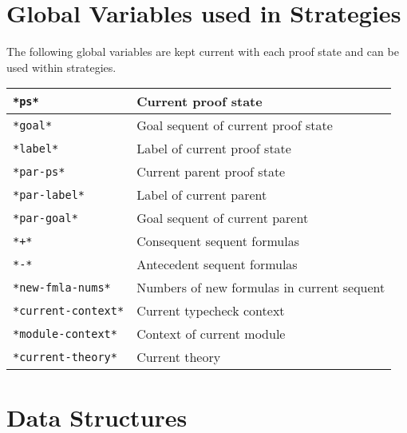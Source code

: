 \documentclass[12pt]{book}
\makeatletter
\newcommand{\indtt}[1]{\texttt{#1}\index{#1@{\texttt{#1}}}}  %
\makeatother
\begin{document}
\section{Global Variables used in Strategies}

The following global variables are kept current with each proof state
and can be used within strategies.  

\noindent
\begin{tabularx}{\textwidth}{|l|X|}
\hline
\indtt{*ps*} & Current proof state \\\hline
\indtt{*goal*} & Goal sequent of current proof state \\\hline
\indtt{*label*} & Label of current proof state  \\\hline
\indtt{*par-ps*} & Current parent proof state \\\hline
\indtt{*par-label*} & Label of current parent \\\hline
\indtt{*par-goal*} & Goal sequent of current parent \\\hline
\indtt{*+*} & Consequent sequent formulas \\\hline
\indtt{*-*} & Antecedent sequent formulas \\\hline
\indtt{*new-fmla-nums*} &  Numbers of new formulas in current sequent
\\\hline
\indtt{*current-context*} & Current typecheck context \\\hline
\indtt{*module-context*} & Context of current module \\\hline
\indtt{*current-theory*} & Current theory \\\hline 
\end{tabularx}

\section{Data Structures}
\end{document}
